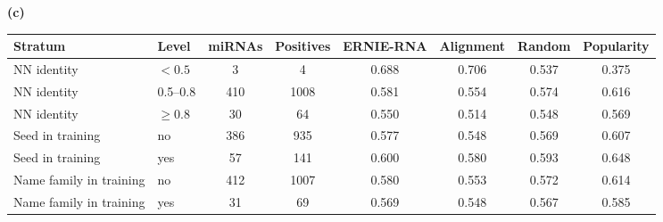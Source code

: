 \begin{table}[h]
\textbf{(c)}\\[2pt]\begin{tabular}{llcccccc}\toprule Stratum & Level & miRNAs & Positives & ERNIE-RNA & Alignment & Random & Popularity\\\midrule
NN identity & $<0.5$ & 3 & 4 & 0.688 & 0.706 & 0.537 & 0.375\\
NN identity & 0.5--0.8 & 410 & 1008 & 0.581 & 0.554 & 0.574 & 0.616\\
NN identity & $\ge0.8$ & 30 & 64 & 0.550 & 0.514 & 0.548 & 0.569\\
Seed in training & no & 386 & 935 & 0.577 & 0.548 & 0.569 & 0.607\\
Seed in training & yes & 57 & 141 & 0.600 & 0.580 & 0.593 & 0.648\\
Name family in training & no & 412 & 1007 & 0.580 & 0.553 & 0.572 & 0.614\\
Name family in training & yes & 31 & 69 & 0.569 & 0.548 & 0.567 & 0.585\\
\bottomrule\end{tabular}
\end{table}
